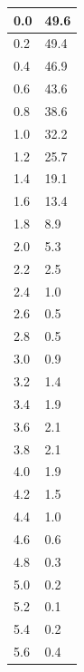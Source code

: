 \documentclass{fizykalab}
\begin{document}
{\begin{figure}[htp]
\begin{minipage}[t]{0.5\textwidth}
\begin{minipage}[t]{0.5\textwidth}
				\begin{tabular}{|p{3.5em}|p{3.5em}|}
					\hline
					0.0 & 49.6 \\ \hline
					0.2 & 49.4 \\ \hline
					0.4 & 46.9 \\ \hline
					0.6 & 43.6 \\ \hline
					0.8 & 38.6 \\ \hline
					1.0 & 32.2 \\ \hline
					1.2 & 25.7 \\ \hline
					1.4 & 19.1 \\ \hline
					1.6 & 13.4 \\ \hline
					1.8 & 8.9 \\ \hline
					2.0 & 5.3 \\ \hline
					2.2 & 2.5 \\ \hline
					2.4 & 1.0 \\ \hline
					2.6 & 0.5 \\ \hline
					2.8 & 0.5 \\ \hline
					3.0 & 0.9 \\ \hline
					3.2 & 1.4 \\ \hline
					3.4 & 1.9 \\ \hline
					3.6 & 2.1 \\ \hline
					3.8 & 2.1 \\ \hline
					4.0 & 1.9 \\ \hline
					4.2 & 1.5 \\ \hline
					4.4 & 1.0 \\ \hline
					4.6 & 0.6 \\ \hline
					4.8 & 0.3 \\ \hline
					5.0 & 0.2 \\ \hline
					5.2 & 0.1 \\ \hline
					5.4 & 0.2 \\ \hline
					5.6 & 0.4 \\ \hline
				\end{tabular}
		\end{minipage}%
		
		\vspace*{1em}
		\hspace*{-2em}
		
		\hspace*{\fill}
	\end{minipage}%
	\hfill
	\begin{minipage}[t]{0.5\textwidth}
		

\end{minipage}
\end{figure}}
\end{document}
